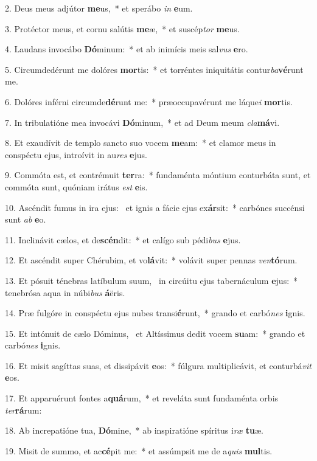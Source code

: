 2. Deus meus adjútor \textbf{me}us,~*  et sperábo \textit{in} \textbf{e}um.\

3. Protéctor meus, et cornu salútis \textbf{me}æ,~*  et suscép\textit{tor} \textbf{me}us.\

4. Laudans invocábo \textbf{Dó}minum:~*  et ab inimícis meis sal\textit{vus} \textbf{e}ro.\

5. Circumdedérunt me dolóres \textbf{mor}tis:~*  et torréntes iniquitátis contur\textit{ba}\textbf{vé}runt me.\

6. Dolóres inférni circumde\textbf{dé}runt me:~*  præoccupavérunt me láque\textit{i} \textbf{mor}tis.\

7. In tribulatióne mea invocávi \textbf{Dó}minum,~*  et ad Deum meum \textit{cla}\textbf{má}vi.\

8. Et exaudívit de templo sancto suo vocem \textbf{me}am:~*  et clamor meus in conspéctu ejus, introívit in au\textit{res} \textbf{e}jus.\

9. Commóta est, et contrémuit \textbf{ter}ra:~*  fundaménta móntium conturbáta sunt, et commóta sunt, quóniam irátus \textit{est} \textbf{e}is.\

10. Ascéndit fumus in ira ejus: \dag\  et ignis a fácie ejus ex\textbf{ár}sit:~*  carbónes succénsi sunt \textit{ab} \textbf{e}o.\

11. Inclinávit cælos, et de\textbf{scén}dit:~*  et calígo sub pédi\textit{bus} \textbf{e}jus.\

12. Et ascéndit super Chérubim, et vo\textbf{lá}vit:~*  volávit super pennas \textit{ven}\textbf{tó}rum.\

13. Et pósuit ténebras latíbulum suum, \dag\  in circúitu ejus tabernáculum \textbf{e}jus:~*  tenebrósa aqua in núbi\textit{bus} \textbf{á}ëris.\

14. Præ fulgóre in conspéctu ejus nubes transi\textbf{é}runt,~*  grando et carbó\textit{nes} \textbf{i}gnis.\

15. Et intónuit de cælo Dóminus, \dag\  et Altíssimus dedit vocem \textbf{su}am:~*  grando et carbó\textit{nes} \textbf{i}gnis.\

16. Et misit sagíttas suas, et dissipávit \textbf{e}os:~*  fúlgura multiplicávit, et conturbá\textit{vit} \textbf{e}os.\

17. Et apparuérunt fontes a\textbf{quá}rum,~*  et reveláta sunt fundaménta orbis \textit{ter}\textbf{rá}rum:\

18. Ab increpatióne tua, \textbf{Dó}mine,~*  ab inspiratióne spíritus i\textit{ræ} \textbf{tu}æ.\

19. Misit de summo, et ac\textbf{cé}pit me:~*  et assúmpsit me de a\textit{quis} \textbf{mul}tis.\

